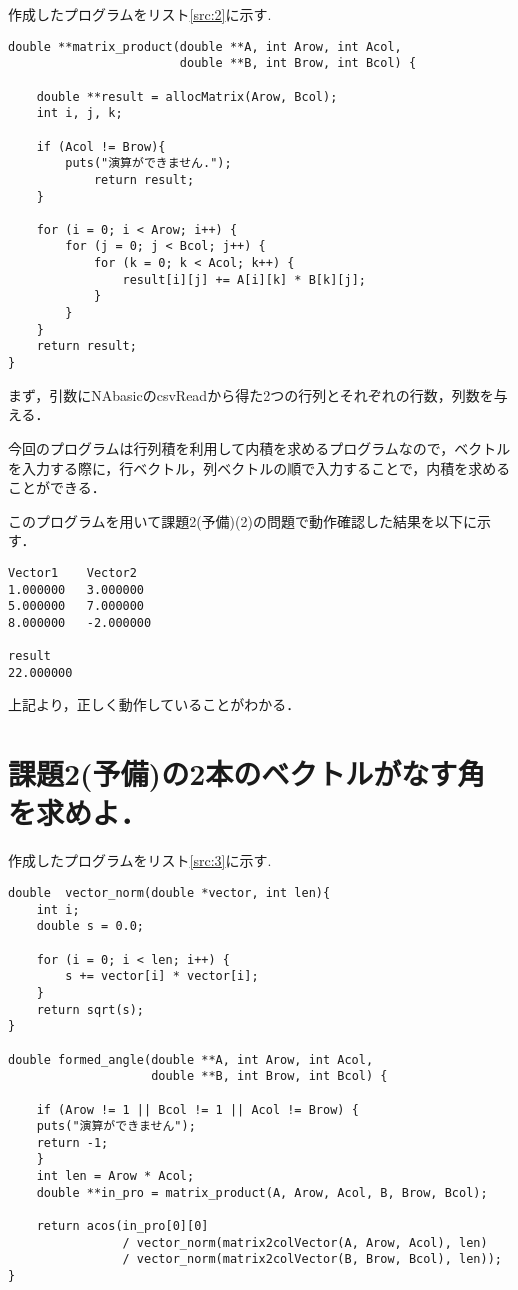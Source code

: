 \documentclass[dvipdfmx,titlepage]{jsarticle}
\begin{document}
作成したプログラムをリスト\ref{src:2}に示す.

\begin{lstlisting}[caption=matrix\_product.c, label=src:2]
double **matrix_product(double **A, int Arow, int Acol,
                        double **B, int Brow, int Bcol) {

    double **result = allocMatrix(Arow, Bcol);
    int i, j, k;

    if (Acol != Brow){
        puts("演算ができません.");
			return result;
    }

    for (i = 0; i < Arow; i++) {
        for (j = 0; j < Bcol; j++) {
            for (k = 0; k < Acol; k++) {
                result[i][j] += A[i][k] * B[k][j];
            }
        }
    }
    return result;
}
\end{lstlisting}

まず，引数にNAbasicのcsvReadから得た2つの行列とそれぞれの行数，列数を与える．

今回のプログラムは行列積を利用して内積を求めるプログラムなので，ベクトルを入力する際に，行ベクトル，列ベクトルの順で入力することで，内積を求めることができる．

このプログラムを用いて課題2(予備)(2)の問題で動作確認した結果を以下に示す．

\begin{verbatim}
Vector1    Vector2
1.000000   3.000000
5.000000   7.000000
8.000000   -2.000000

result
22.000000
\end{verbatim}

上記より，正しく動作していることがわかる．

\section{課題2(予備)の2本のベクトルがなす角を求めよ．}

作成したプログラムをリスト\ref{src:3}に示す.

\begin{lstlisting}[caption=formed\_angle.c, label=src:3]
double 	vector_norm(double *vector, int len){
    int i;
    double s = 0.0;

    for (i = 0; i < len; i++) {
        s += vector[i] * vector[i];
    }
    return sqrt(s);
}

double formed_angle(double **A, int Arow, int Acol,
                    double **B, int Brow, int Bcol) {

    if (Arow != 1 || Bcol != 1 || Acol != Brow) {
    puts("演算ができません");
    return -1;
    }
    int len = Arow * Acol;
    double **in_pro = matrix_product(A, Arow, Acol, B, Brow, Bcol);

    return acos(in_pro[0][0] 
                / vector_norm(matrix2colVector(A, Arow, Acol), len)
                / vector_norm(matrix2colVector(B, Brow, Bcol), len));
}
\end{lstlisting}
\end{document}
